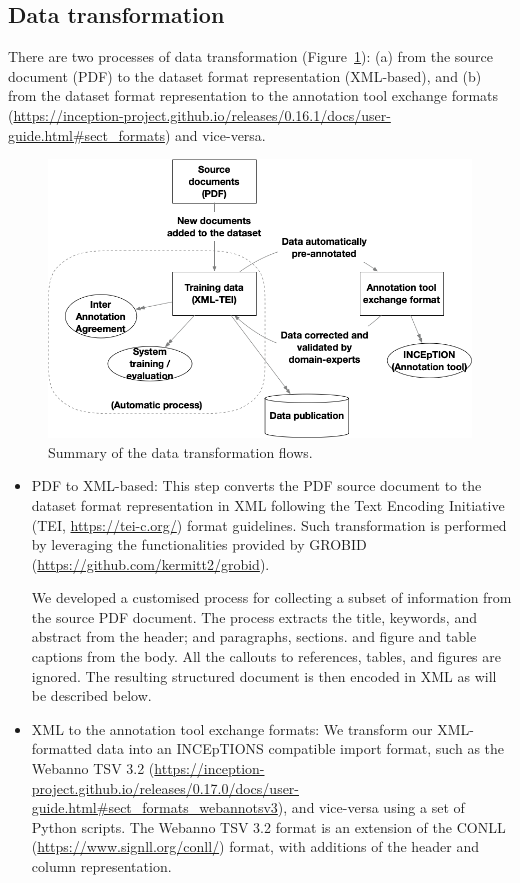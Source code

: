 \subsection{Data transformation}
\label{subsec:transformation-of-data}
There are two processes of data transformation (Figure~\ref{fig:data-transformation}): (a) from the source document (PDF) to the dataset format representation (XML-based), and (b) from the dataset format representation to the annotation tool exchange formats (\url{https://inception-project.github.io/releases/0.16.1/docs/user-guide.html\#sect_formats}) and vice-versa. 

\begin{figure}[htb]
    \centering
    \includegraphics[width=\linewidth]{figures/supermat/Fig3.png}
    \caption{Summary of the data transformation flows.}
    \label{fig:data-transformation}
\end{figure}

\begin{itemize}
    \item PDF to XML-based: This step converts the PDF source document to the dataset format representation in XML following the Text Encoding Initiative (TEI, \url{https://tei-c.org/}) format guidelines. 
    Such transformation is performed by leveraging the functionalities provided by GROBID (\url{https://github.com/kermitt2/grobid}).
    
    We developed a customised process for collecting a subset of information from the source PDF document.
    The process extracts the title, keywords, and abstract from the header; and paragraphs, sections. and figure and table captions from the body.
    All the callouts to references, tables, and figures are ignored.
    The resulting structured document is then encoded in XML as will be described below. 
    \item XML to the annotation tool exchange formats: We transform our XML-formatted data into an INCEpTIONS compatible import format, such as the Webanno TSV 3.2 (\url{https://inception-project.github.io/releases/0.17.0/docs/user-guide.html\#sect_formats_webannotsv3}), and vice-versa using a set of Python scripts. 
    The Webanno TSV 3.2 format is an extension of the CONLL (\url{https://www.signll.org/conll/}) format, with additions of the header and column representation.
\end{itemize}

